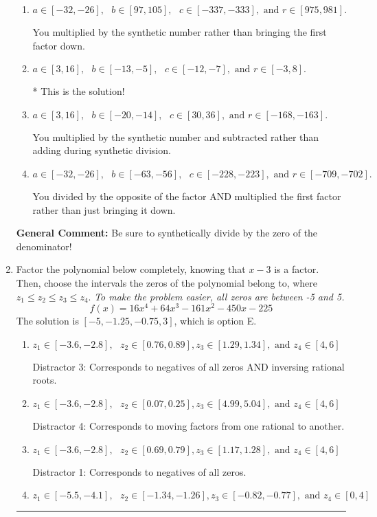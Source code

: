 \documentclass{extbook}[14pt]
\newcommand{\litem}[1]{\item #1

\rule{\textwidth}{0.4pt}}
\begin{document}
\begin{enumerate}
{\begin{enumerate}[label=\Alph*.]
 You divided by the opposite of the factor.
\item \( a \in [-32, -26], \text{   } b \in [97, 105], \text{   } c \in [-337, -333], \text{   and   } r \in [975, 981]. \)

 You multiplied by the synthetic number rather than bringing the first factor down.
\item \( a \in [3, 16], \text{   } b \in [-13, -5], \text{   } c \in [-12, -7], \text{   and   } r \in [-3, 8]. \)

* This is the solution!
\item \( a \in [3, 16], \text{   } b \in [-20, -14], \text{   } c \in [30, 36], \text{   and   } r \in [-168, -163]. \)

 You multiplied by the synthetic number and subtracted rather than adding during synthetic division.
\item \( a \in [-32, -26], \text{   } b \in [-63, -56], \text{   } c \in [-228, -223], \text{   and   } r \in [-709, -702]. \)

 You divided by the opposite of the factor AND multiplied the first factor rather than just bringing it down.
\end{enumerate}

\textbf{General Comment:} Be sure to synthetically divide by the zero of the denominator!
}
\litem{
Factor the polynomial below completely, knowing that $x-3$ is a factor. Then, choose the intervals the zeros of the polynomial belong to, where $z_1 \leq z_2 \leq z_3 \leq z_4$. \textit{To make the problem easier, all zeros are between -5 and 5.}
\[ f(x) = 16x^{4} +64 x^{3} -161 x^{2} -450 x -225 \]The solution is \( [-5, -1.25, -0.75, 3] \), which is option E.\begin{enumerate}[label=\Alph*.]
\item \( z_1 \in [-3.6, -2.8], \text{   }  z_2 \in [0.76, 0.89], z_3 \in [1.29, 1.34], \text{   and   } z_4 \in [4, 6] \)

 Distractor 3: Corresponds to negatives of all zeros AND inversing rational roots.
\item \( z_1 \in [-3.6, -2.8], \text{   }  z_2 \in [0.07, 0.25], z_3 \in [4.99, 5.04], \text{   and   } z_4 \in [4, 6] \)

 Distractor 4: Corresponds to moving factors from one rational to another.
\item \( z_1 \in [-3.6, -2.8], \text{   }  z_2 \in [0.69, 0.79], z_3 \in [1.17, 1.28], \text{   and   } z_4 \in [4, 6] \)

 Distractor 1: Corresponds to negatives of all zeros.
\item \( z_1 \in [-5.5, -4.1], \text{   }  z_2 \in [-1.34, -1.26], z_3 \in [-0.82, -0.77], \text{   and   } z_4 \in [0, 4] \)


\end{enumerate}}
\end{enumerate}
\end{document}
